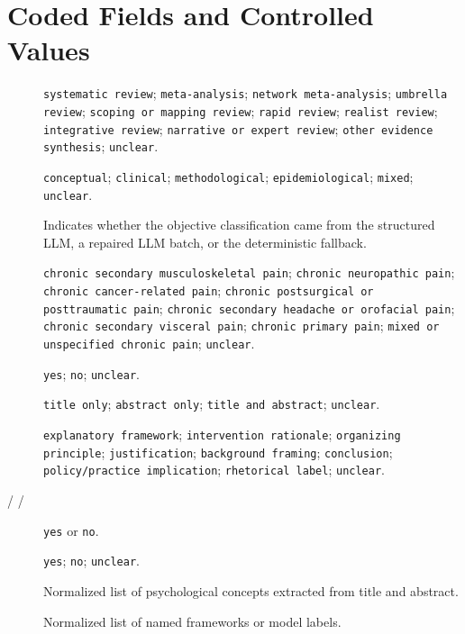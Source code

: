 \documentclass[11pt]{article}
\begin{document}
\section*{Coded Fields and Controlled Values}
\begin{description}
\item[] \texttt{systematic review}; \texttt{meta-analysis}; \texttt{network meta-analysis}; \texttt{umbrella review}; \texttt{scoping or mapping review}; \texttt{rapid review}; \texttt{realist review}; \texttt{integrative review}; \texttt{narrative or expert review}; \texttt{other evidence synthesis}; \texttt{unclear}.
\item[] \texttt{conceptual}; \texttt{clinical}; \texttt{methodological}; \texttt{epidemiological}; \texttt{mixed}; \texttt{unclear}.
\item[] Indicates whether the objective classification came from the structured LLM, a repaired LLM batch, or the deterministic fallback.
\item[] \texttt{chronic secondary musculoskeletal pain}; \texttt{chronic neuropathic pain}; \texttt{chronic cancer-related pain}; \texttt{chronic postsurgical or posttraumatic pain}; \texttt{chronic secondary headache or orofacial pain}; \texttt{chronic secondary visceral pain}; \texttt{chronic primary pain}; \texttt{mixed or unspecified chronic pain}; \texttt{unclear}.
\item[] \texttt{yes}; \texttt{no}; \texttt{unclear}.
\item[] \texttt{title only}; \texttt{abstract only}; \texttt{title and abstract}; \texttt{unclear}.
\item[] \texttt{explanatory framework}; \texttt{intervention rationale}; \texttt{organizing principle}; \texttt{justification}; \texttt{background framing}; \texttt{conclusion}; \texttt{policy/practice implication}; \texttt{rhetorical label}; \texttt{unclear}.
\item[ /  / ] \texttt{yes} or \texttt{no}.
\item[] \texttt{yes}; \texttt{no}; \texttt{unclear}.
\item[] Normalized list of psychological concepts extracted from title and abstract.
\item[] Normalized list of named frameworks or model labels.

\end{description}
\end{document}
